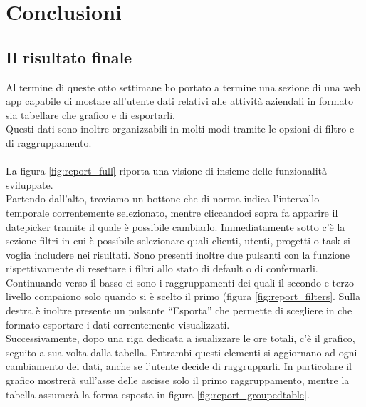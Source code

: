 
\chapter{Conclusioni}
\label{cap:conclusioni}

\section{Il risultato finale}
Al termine di queste otto settimane ho portato a termine una sezione di una web app capabile di mostare all'utente dati relativi alle attività aziendali in formato sia tabellare che grafico e di esportarli.\\
Questi dati sono inoltre organizzabili in molti modi tramite le opzioni di filtro e di raggruppamento.\\\\
La figura \ref{fig:report_full} riporta una visione di insieme delle funzionalità sviluppate.\\
Partendo dall'alto, troviamo un bottone che di norma indica l'intervallo temporale correntemente selezionato, mentre cliccandoci sopra fa apparire il datepicker tramite il quale è possibile cambiarlo. Immediatamente sotto c'è la sezione filtri in cui è possibile selezionare quali clienti, utenti, progetti o task si voglia includere nei risultati. Sono presenti inoltre due pulsanti con la funzione rispettivamente di resettare i filtri allo stato di default o di confermarli.\\
Continuando verso il basso ci sono i raggruppamenti dei quali il secondo e terzo livello compaiono solo quando si è scelto il primo (figura \ref{fig:report_filters}. Sulla destra è inoltre presente un pulsante ``Esporta'' che permette di scegliere in che formato esportare i dati correntemente visualizzati.\\
Successivamente, dopo una riga dedicata a isualizzare le ore totali, c'è il grafico, seguito a sua volta dalla tabella. Entrambi questi elementi si aggiornano ad ogni cambiamento dei dati, anche se l'utente decide di raggrupparli. In particolare il grafico mostrerà sull'asse delle ascisse solo il primo raggruppamento, mentre la tabella assumerà la forma esposta in figura \ref{fig:report_groupedtable}.\\
